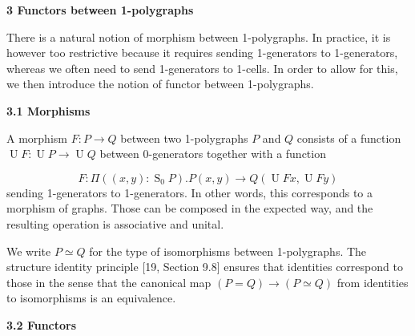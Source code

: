  
 
 


 
\par\medskip\noindent\textbf{3 Functors between 1-polygraphs}\par
 
 
There is a natural notion of morphism between 1-polygraphs. In practice, it is however too restrictive because it requires sending 1-generators to 1-generators, whereas we often need to send 1-generators to 1-cells. In order to allow for this, we then introduce the notion of functor between 1-polygraphs.\par
 
 
 
\par\medskip\noindent\textbf{3.1 Morphisms}\par
 
 
A morphism $F:P\to Q$ between two 1-polygraphs $P$ and $Q$ consists of a function $\operatorname{U}F:\operatorname{U}P\to\operatorname{U}Q$ between 0-generators together with a function\par
    \[F:\Pi((x,y):\operatorname{S}_{0}P).P(x,y)\to Q(\operatorname{U}Fx,\operatorname{U}Fy)\]    
sending 1-generators to 1-generators. In other words, this corresponds to a morphism of graphs. Those can be composed in the expected way, and the resulting operation is associative and unital.\par
 
 
 
We write $P\simeq Q$ for the type of isomorphisms between 1-polygraphs. The structure identity principle [19, Section 9.8] ensures that identities correspond to those in the sense that the canonical map $(P=Q)\to(P\simeq Q)$ from identities to isomorphisms is an equivalence.\par
 
 
 
 
\par\medskip\noindent\textbf{3.2 Functors}\par
 
